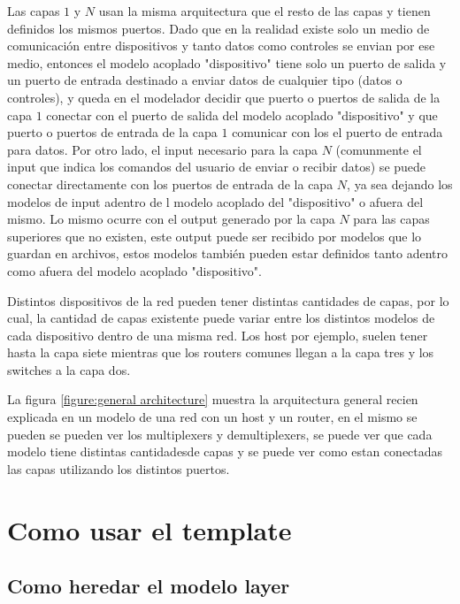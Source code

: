 \documentclass[10pt,a4paper]{article}
\begin{document}
Las capas $1$ y $N$ usan la misma arquitectura que el resto de las capas y tienen definidos los mismos puertos. Dado que en la realidad existe solo un medio de comunicación entre dispositivos y tanto datos como controles se envian por ese medio, entonces el modelo acoplado "dispositivo" tiene solo un puerto de salida y un puerto de entrada destinado a enviar datos de cualquier tipo (datos o controles), y queda en el modelador decidir que puerto o puertos de salida de la capa $1$ conectar con el puerto de salida del modelo acoplado "dispositivo" y que puerto o puertos de entrada de la capa $1$ comunicar con los el puerto de entrada para datos. Por otro lado, el input necesario para la capa $N$ (comunmente el input que indica los comandos del usuario de enviar o recibir datos) se puede conectar directamente con los puertos de entrada de la capa $N$, ya sea dejando los modelos de input adentro de l modelo acoplado del "dispositivo" o afuera del mismo. Lo mismo ocurre con el output generado por la capa $N$ para las capas superiores que no existen, este output puede ser recibido por modelos que lo guardan en archivos, estos modelos también pueden estar definidos tanto adentro como afuera del modelo acoplado "dispositivo".


Distintos dispositivos de la red pueden tener distintas cantidades de capas, por lo cual, la cantidad de capas existente puede variar entre los distintos modelos de cada dispositivo dentro de una misma red. Los host por ejemplo, suelen tener hasta la capa siete mientras que los routers comunes llegan a la capa tres y los switches a la capa dos.

La figura \ref{figure:general architecture} muestra la arquitectura general recien explicada en un modelo de una red con un host y un router, en el mismo se pueden se pueden ver los multiplexers y demultiplexers, se puede ver que cada modelo tiene distintas cantidadesde capas y se puede ver como estan conectadas las capas utilizando los distintos puertos.


\section{Como usar el template}
\subsection{Como heredar el modelo layer}
\end{document}
